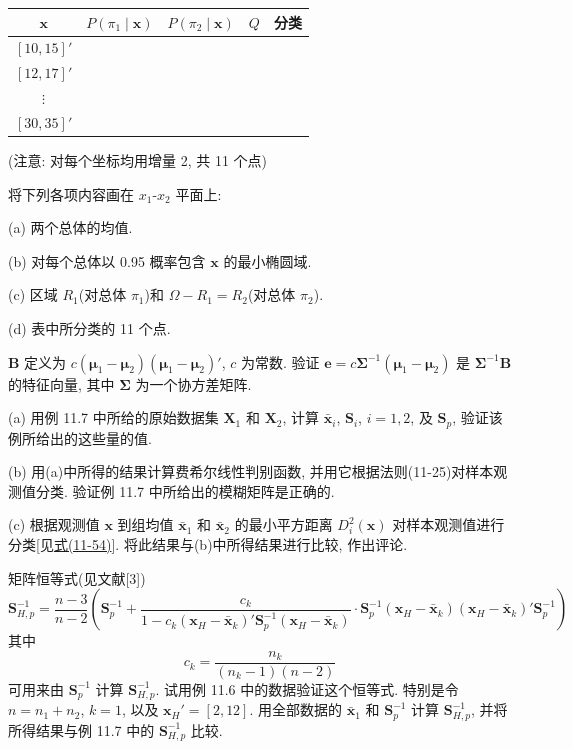 
\begin{mvtable}
\begin{tabular}{ccccc}
\toprule
$\mathbf{x}$ & $P(\pi_1\mid \mathbf{x})$ & $P(\pi_2\mid \mathbf{x})$ & $Q$ & 分类\\
\midrule
$[10,15]'$ & & & & \\
$[12,17]'$ & & & & \\
$\vdots$ & & & & \\
$[30,35]'$ & & & & \\
\bottomrule
\end{tabular}
\end{mvtable}

(注意: 对每个坐标均用增量 2, 共 11 个点)

将下列各项内容画在 $x_1$-$x_2$ 平面上:

(a) 两个总体的均值.

(b) 对每个总体以 0.95 概率包含 $\mathbf{x}$ 的最小椭圆域.

(c) 区域 $R_1$(对总体 $\pi_1$)和 $\Omega-R_1=R_2$(对总体 $\pi_2$).

(d) 表中所分类的 11 个点.

\quad $\mathbf{B}$ 定义为 $c(\boldsymbol{\mu}_1-\boldsymbol{\mu}_2)(\boldsymbol{\mu}_1-\boldsymbol{\mu}_2)'$, $c$ 为常数. 验证 $\mathbf{e}=c\boldsymbol{\Sigma}^{-1}(\boldsymbol{\mu}_1-\boldsymbol{\mu}_2)$ 是 $\boldsymbol{\Sigma}^{-1}\mathbf{B}$ 的特征向量, 其中 $\boldsymbol{\Sigma}$ 为一个协方差矩阵.

\quad (a) 用例 11.7 中所给的原始数据集 $\mathbf{X}_1$ 和 $\mathbf{X}_2$, 计算 $\bar{\mathbf{x}}_i$, $\mathbf{S}_i$, $i=1,2$, 及 $\mathbf{S}_p$, 验证该例所给出的这些量的值.

(b) 用(a)中所得的结果计算费希尔线性判别函数, 并用它根据法则(11-25)对样本观测值分类. 验证例 11.7 中所给出的模糊矩阵是正确的.

(c) 根据观测值 $\mathbf{x}$ 到组均值 $\bar{\mathbf{x}}_1$ 和 $\bar{\mathbf{x}}_2$ 的最小平方距离 $D_i^2(\mathbf{x})$ 对样本观测值进行分类[见\hyperref[eq:11-54]{式(11-54)}]. 将此结果与(b)中所得结果进行比较, 作出评论.

\quad 矩阵恒等式(见文献[3])
\[
\mathbf{S}_{H,p}^{-1}=\frac{n-3}{n-2}\left(\mathbf{S}_p^{-1}+\frac{c_k}{1-c_k(\mathbf{x}_H-\bar{\mathbf{x}}_k)'\mathbf{S}_p^{-1}(\mathbf{x}_H-\bar{\mathbf{x}}_k)}\cdot\mathbf{S}_p^{-1}(\mathbf{x}_H-\bar{\mathbf{x}}_k)(\mathbf{x}_H-\bar{\mathbf{x}}_k)'\mathbf{S}_p^{-1}\right)
\]
其中
\[
c_k=\frac{n_k}{(n_k-1)(n-2)}
\]
可用来由 $\mathbf{S}_p^{-1}$ 计算 $\mathbf{S}_{H,p}^{-1}$. 试用例 11.6 中的数据验证这个恒等式. 特别是令 $n=n_1+n_2$, $k=1$, 以及 $\mathbf{x}_H'=[2,12]$. 用全部数据的 $\bar{\mathbf{x}}_1$ 和 $\mathbf{S}_p^{-1}$ 计算 $\mathbf{S}_{H,p}^{-1}$, 并将所得结果与例 11.7 中的 $\mathbf{S}_{H,p}^{-1}$ 比较.

